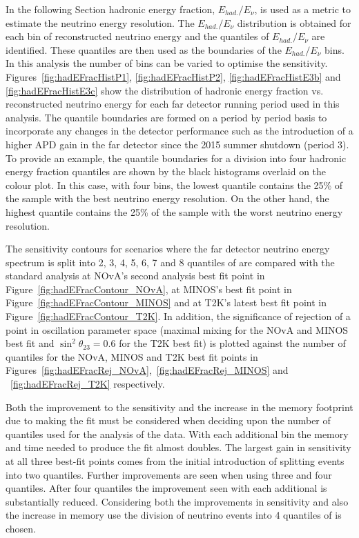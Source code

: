 In the following Section hadronic energy fraction, $E_{had.} /
E_{\nu}$, is used as a metric to estimate the neutrino energy
resolution. 
The $E_{had.} / E_{\nu}$ distribution is obtained for each bin of
reconstructed neutrino energy and the quantiles of $E_{had.}/E_{\nu}$
are identified.  
These quantiles are then used as the boundaries of the $E_{had.} /
E_\nu$ bins. 
In this analysis the number of \hadefrac{} bins can be varied to
optimise the sensitivity.  
Figures~\ref{fig:hadEFracHistP1}, \ref{fig:hadEFracHistP2},
\ref{fig:hadEFracHistE3b} 
and \ref{fig:hadEFracHistE3c} show the distribution of
hadronic energy fraction vs. reconstructed neutrino energy for each
far detector running period used in this analysis. 
The quantile boundaries are formed on a period by period basis to
incorporate any changes in the detector performance such as the
introduction of a higher APD gain in the far detector since the 2015
summer shutdown (period 3). 
To provide an example, the quantile
boundaries for a division into four hadronic energy fraction quantiles
are shown by the black histograms overlaid on the colour plot. 
In this case, with four \hadefrac{} bins, the lowest \hadefrac{}
quantile contains the
25\% of the sample with the best neutrino energy resolution. On the
other hand, the highest quantile contains the 25\% of the sample with
the worst neutrino energy resolution.

The sensitivity contours for scenarios where the far detector neutrino
energy spectrum is split into 2, 3, 4, 5, 6, 7 and 8 quantiles of
\hadefrac{} are compared with the standard analysis
at NOvA's second analysis best fit point in
Figure~\ref{fig:hadEFracContour_NOvA}, at MINOS's best fit point in
Figure~\ref{fig:hadEFracContour_MINOS} and at T2K's latest best fit
point in Figure~\ref{fig:hadEFracContour_T2K}. In addition, the
significance of rejection of a point in oscillation parameter space
(maximal mixing for the NOvA and MINOS best fit and $\sin^2\theta_{23}
= 0.6$ for the T2K best fit) is plotted against 
the number of \hadefrac{} quantiles for the NOvA, MINOS and T2K best fit
points in
Figures~\ref{fig:hadEFracRej_NOvA},~\ref{fig:hadEFracRej_MINOS} and
~\ref{fig:hadEFracRej_T2K} respectively.


Both the improvement to
the sensitivity and the increase in the memory footprint due to making
the fit must be considered
when deciding upon the number of \hadefrac{} quantiles used
for the analysis of the data.
With each additional \hadefrac{} bin the
memory and time needed to produce the fit almost doubles. 
The largest gain in sensitivity at all three best-fit points comes
from the initial introduction of splitting events into two \hadefrac{}
quantiles. Further improvements are seen when using three and four
quantiles. After four quantiles the improvement seen with each
additional \hadefrac{} is substantially reduced. Considering both the
improvements in sensitivity and also the increase in memory use the
division of neutrino events into 4 quantiles of \hadefrac{} is chosen. 


